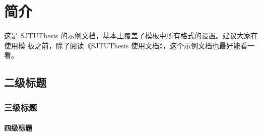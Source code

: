 \documentclass{sjtureport}
\begin{document}



\begin{abstract}[zh]
	中文摘要应该将学位论文的内容要点简短明了地表达出来，应该包含论文中的基本信息，
	体现科研工作的核心思想。摘要内容应涉及本项科研工作的目的和意义、研究方法、研究
	成果、结论及意义。注意突出学位论文中具有创新性的成果和新见解的部分。摘要中不宜
	使用公式、化学结构式、图表和非公知公用的符号和术语，不标注引用文献编号。硕士学
	位论文中文摘要字数为 500 字左右，博士学位论文中文摘要字数为 800 字左右。英文摘
	要内容应与中文摘要内容一致。

	摘要页的下方注明本文的关键词（4 \textasciitilde{} 6个）。
\end{abstract}

\begin{abstract}[en]
	Shanghai Jiao Tong University (SJTU) is a key university in China. SJTU was
	founded in 1896. It is one of the oldest universities in China. The University
	has nurtured large numbers of outstanding figures include JIANG Zemin, DING
	Guangen, QIAN Xuesen, Wu Wenjun, WANG An, etc.

	SJTU has beautiful campuses, Bao Zhaolong Library, Various laboratories. It
	has been actively involved in international academic exchange programs. It is
	the center of CERNet in east China region, through computer networks, SJTU has
	faster and closer connection with the world.
\end{abstract}

\tableofcontents



\chapter{简介}

这是 SJTUThesis 的示例文档，基本上覆盖了模板中所有格式的设置。建议大家在使用模
板之前，除了阅读《SJTUThesis 使用文档》，这个示例文档也最好能看一看。

\section{二级标题}

\subsection{三级标题}

\subsubsection{四级标题}
\end{document}
